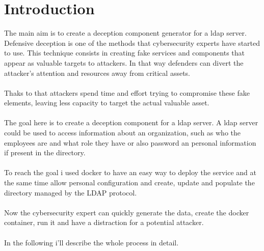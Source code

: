 \chapter*{Introduction}
The main aim is to create a deception component generator for a ldap server. Defensive deception is one of the methods that cybersecurity experts have started to use. This technique consists in creating fake services and components that appear as valuable targets to attackers.
In that way defenders can divert the attacker’s attention and resources away from critical assets. 
\\\\
Thaks to that attackers spend time and effort trying to compromise these fake elements, leaving less capacity to target the actual valuable asset. 
\\\\
The goal here is to create a deception component for a ldap server. A ldap server could be used to access information about an organization, such as who the employees are and what role they have or also password an personal information if present in the directory. 
\\\\
To reach the goal i used docker to have an easy way to deploy the service and at the same time allow personal configuration and create, update and populate the directory managed by the LDAP protocol. 
\\\\
Now the cybersecurity expert can quickly generate the data, create the docker container, run it and have a distraction for a potential attacker. 
\\\\
In the following i'll describe the whole process in detail.


